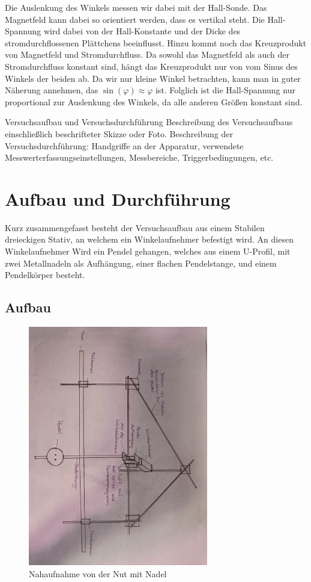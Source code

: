 \documentclass[twoside]{protokoll}
\begin{document}
Die Auslenkung des Winkels messen wir dabei mit der Hall-Sonde.
Das Magnetfeld kann dabei so orientiert werden, dass es vertikal steht.
Die Hall-Spannung wird dabei von der Hall-Konstante und  der Dicke des stromdurchflossenen Plättchens beeinflusst.
Hinzu kommt noch das Kreuzprodukt von Magnetfeld und Stromdurchfluss. Da sowohl das Magnetfeld als auch der Stromdurchfluss konstant sind, hängt das Kreuzprodukt nur von vom Sinus des Winkels der beiden ab.
Da wir nur kleine Winkel betrachten, kann man in guter Näherung annehmen, das $\sin(\varphi) \approx \varphi$ ist.
Folglich ist die Hall-Spannung nur proportional zur Auslenkung des Winkels, da alle anderen Größen konstant sind.



\begin{aufgabe}{Versuchsaufbau und Versuchsdurchführung}
  Beschreibung des Versuchsaufbaus einschließlich beschrifteter Skizze
  oder Foto. Beschreibung der Versuchsdurchführung: Handgriffe an der
  Apparatur, verwendete Messwerterfassungseinstellungen, Messbereiche,
  Triggerbedingungen, etc.
\end{aufgabe}

\section{Aufbau und Durchführung}
Kurz zusammengefasst besteht der Versuchsaufbau aus einem Stabilen dreieckigen Stativ, an welchem ein Winkelaufnehmer befestigt wird.
An diesen Winkelaufnehmer Wird ein Pendel gehangen, welches aus einem U-Profil, mit zwei Metallnadeln als Aufhängung, einer flachen Pendelstange, und einem Pendelkörper besteht.\\
\subsection{Aufbau}
\begin{figure}[H]
    \centering
    \includegraphics[width=0.7\textwidth]{Bilder/Kompletter-Aufbau.pdf}
    \caption{Nahaufnahme von der Nut mit Nadel}
\end{figure}
\end{document}
